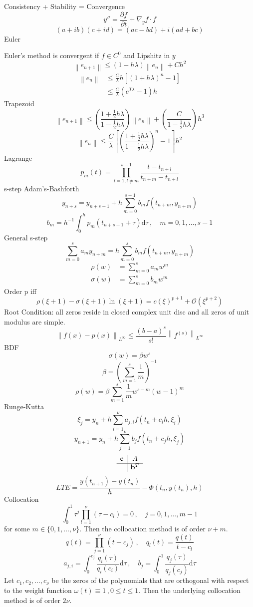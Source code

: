 \documentclass[letterpaper]{article}
\providecommand{\norm}[1]{\left\lVert#1\right\rVert}
\def\d{\mathrm{d}}
\begin{document}
\begin{multicols}{2}
\footnotesize
Consistency + Stability = Convergence
\[
y''=\frac{\partial f}{\partial t}+\nabla_yf\cdot f
\]
\[
(a+ib)(c+id)=(ac-bd)+i(ad+bc)
\]
Euler

Euler's method is convergent if $f\in C^0$ and Lipshitz in $y$
\[
\norm{e_{n+1}}\le(1+h\lambda)\norm{e_n}+Ch^2
\]
\begin{align*}
\norm{e_n}&\le\frac{C}{\lambda}h\left[(1+h\lambda)^n-1\right]\\
&\le\frac{C}{\lambda}(e^{T\lambda}-1)h
\end{align*}
Trapezoid
\[
\norm{e_{n+1}}\le\left(\frac{1+\frac{1}{2}h\lambda}{1-\frac{1}{2}h\lambda}\right)\norm{e_n}+\left(\frac{C}{1-\frac{1}{2}h\lambda}\right)h^3
\]
\[
\norm{e_n}\leq\frac{C}{\lambda}\left[\left(\frac{1+\frac{1}{2}h\lambda}{1-\frac{1}{2}h\lambda}\right)^n-1\right]h^2
\]
Lagrange
\[
p_m(t)=\prod_{l=1,l\neq m}^{s-1}\frac{t-t_{n+l}}{t_{n+m}-t_{n+l}}
\]
s-step Adam's-Bashforth
\[
y_{n+s}=y_{n+s-1}+h\sum_{m=0}^{s-1}b_mf(t_{n+m},y_{n+m})
\]
\[
b_m=h^{-1}\int_0^hp_m(t_{n+s-1}+\tau)\d\tau\,,\quad m=0,1,\dots,s-1
\]
General s-step
\[
\sum_{m=0}^sa_my_{n+m}=h\sum_{m=0}^sb_mf(t_{n+m},y_{n+m})
\]
\begin{align*}
\rho(w)&=\sum_{m=0}^sa_mw^m\\
\sigma(w)&=\sum_{m=0}^sb_mw^m
\end{align*}
Order p iff
\[
\rho(\xi+1)-\sigma(\xi+1)\ln(\xi+1)=c(\xi)^{p+1}+\mathcal{O}(\xi^{p+2})
\]
Root Condition: all zeros reside in closed complex unit disc and all zeros of
unit modulus are simple.
\[
\norm{f(x)-p(x)}_{L^\infty}\le\frac{(b-a)^s}{s!}\norm{f^{(s)}}_{L^\infty}
\]
BDF
\[
\sigma(w)=\beta w^s
\]
\[
\beta=\left(\sum_{m=1}^s\frac{1}{m}\right)^{-1}
\]
\[
\rho(w)=\beta\sum_{m=1}^s\frac{1}{m}w^{s-m}(w-1)^m
\]
Runge-Kutta
\[
\xi_j=y_n+h\sum_{i=1}^\nu a_{j,i}f(t_n+c_ih,\xi_i)
\]
\[
y_{n+1}=y_n+h\sum_{j=1}^\nu b_jf(t_n+c_jh,\xi_j)
\]
\[
\begin{array}{c|c}
\mathbf{c} & A\\
\hline
& \mathbf{b}^T
\end{array}
\]
\[
LTE=\frac{y(t_{n+1})-y(t_n)}{h}-\Phi(t_n,y(t_n),h)
\]
Collocation
\[
\int_0^1\tau^j\prod_{l=1}^\nu(\tau-c_l)=0\,,\quad j=0,1,\dots,m-1
\]
for some $m\in\{0,1,\dots,\nu\}$. Then the collocation method is of order
$\nu+m$.
\[
q(t)=\prod_{j=1}^\nu(t-c_j)\,,\quad q_l(t)=\frac{q(t)}{t-c_l}
\]
\[
a_{j,i}=\int_0^{c_j}\frac{q_i(\tau)}{q_i(c_i)}\d\tau\,,\quad    
b_j=\int_0^1\frac{q_j(\tau)}{q_j(c_j)}\d\tau
\]
Let $c_1,c_2,\dots,c_\nu$ be the zeros of the polynomials that are orthogonal
with respect to the weight function $\omega(t)\equiv 1\,,0\le t\le1$. Then the
underlying collocation method is of order $2\nu$.


\end{multicols}
\end{document}
